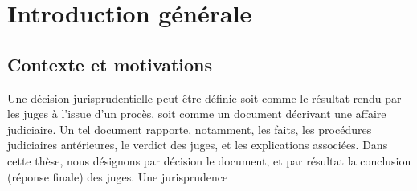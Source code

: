\chapter*{Introduction générale}
\label{chap:intro}

\section{Contexte et motivations}
\label{sec:intro:contexte}
Une décision jurisprudentielle peut être définie soit comme  le résultat rendu par les juges à l'issue d'un procès, soit comme un document décrivant une affaire judiciaire. Un tel document rapporte, notamment,  les faits, les procédures judiciaires antérieures, le verdict des juges, et les explications associées. Dans cette thèse, nous désignons par \og décision \fg{} le document, et par  \og résultat\fg{} la conclusion (réponse finale) des juges. Une jurisprudence
